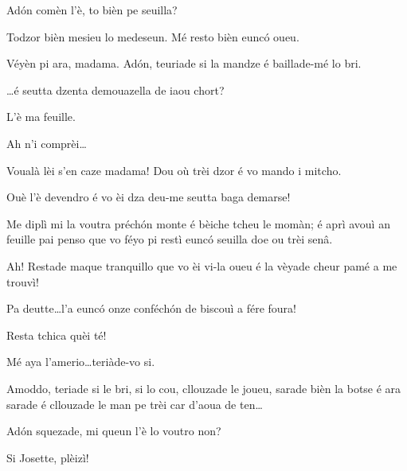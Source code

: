 \begin{drama}
\MedMitchospeaks Ad\'on comèn l'è, to bièn pe seuilla?

\Gerominespeaks Todzor bièn mesieu lo medeseun. Mé resto bièn eunc\'o oueu.

\MedMitchospeaks Véyèn pi ara, madama. Ad\'on, teuriade si la mandze é baillade-mé lo bri.


\MedMitchospeaks{} \ldots é seutta dzenta demouazella de iaou chort?

\Gerominespeaks L’è ma feuille.

\MedMitchospeaks Ah n’i comprèi\ldots


\MedMitchospeaks Voualà lèi s’en caze madama! Dou où trèi dzor é vo mando i mitcho.

\Gerominespeaks Ouè l’è devendro é vo èi dza deu-me seutta baga demarse!

\MedMitchospeaks Me diplì mi la voutra préch\'on monte é bèiche tcheu le momàn; é aprì avouì an feuille pai penso que vo féyo pi restì eunc\'o seuilla doe ou trèi senâ.

\Gerominespeaks Ah! Restade maque tranquillo que vo èi vi-la oueu é la vèyade cheur pamé a me trouvì!

\Casimirspeaks Pa deutte\ldots l’a eunc\'o onze conféch\'on de biscouì a fére foura!

\Gerominespeaks Resta tchica quèi té!


\MedMitchospeaks{} Mé aya l'amerio\ldots teriàde-vo si.


\MedMitchospeaks Amoddo, teriade si le bri, si lo cou, cllouzade le joueu, sarade bièn la botse é ara sarade é cllouzade le man pe trèi car d'aoua de ten\ldots 


\MedMitchospeaks{} Ad\'on squezade, mi queun l'è lo voutro non?

\Feliespeaks Si Josette, plèizì!


\end{drama}
